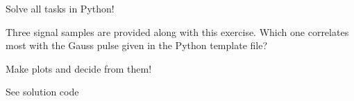 \begin{question}[subtitle={Python Programming: Cross-correlation}]
Solve all tasks in Python!

Three signal samples are provided along with this exercise. Which one correlates most with the Gauss pulse given in the Python template file?

Make plots and decide from them!
\end{question}

\begin{solution}
	See solution code
\end{solution}



%

